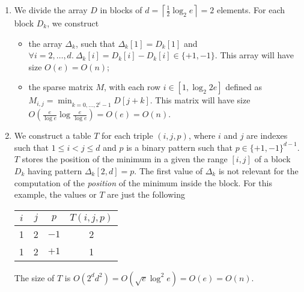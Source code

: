 \begin{enumerate}
\begin{table}[t]
    \label{tab:euler-tour}

  \end{table}

  \item We divide the array $D$ in blocks of $d = \left\lceil \frac{1}{2}\log_2
  e \right\rceil = 2$ elements. For each block $D_k$, we construct
  \begin{itemize}

    \item the array $\Delta_k$, such that $\Delta_k[1] = D_k[1]$ and $\forall i
    = 2, \dots, d.\ \Delta_k[i] = D_k[i] - D_k[i] \in \{+1, -1\}$. This array
    will have size $O(e) = O(n)$;

    \item the sparse matrix $M$, with each row $i \in [1, \log_2 2e]$ defined as
    $M_{i, j} = \min_{k = 0, \dots, 2^i - 1} D[j + k]$. This matrix will have
    size $O(\frac{e}{\log e}\log\frac{e}{\log e}) = O(e) = O(n)$.

  \end{itemize}

  \item We construct a table $T$ for each triple $(i, j, p)$, where $i$ and $j$
  are indexes such that $1 \le i < j \le d$ and $p$ is a binary pattern such
  that $p \in \{+1, -1 \}^{d - 1}$. $T$ stores the position of the minimum in a
  given the range $[i, j]$ of a block $D_k$ having pattern $\Delta_k[2, d] = p$.
  The first value of $\Delta_k$ is not relevant for the computation of the
  \emph{position} of the minimum inside the block.  For this example, the values
  or $T$ are just the following
  \begin{center}
    \begin{tabular}{c|c|c||c}
      $i$ & $j$ & $p$ & $T(i, j, p)$ \\\hline
      1 & 2 & $-1$ & 2 \\
      1 & 2 & $+1$ & 1 \\
    \end{tabular}
  \end{center}
  The size of $T$ is $O(2^dd^2) = O(\sqrt{e}\log^2 e) = O(e) = O(n)$.

\end{enumerate}


